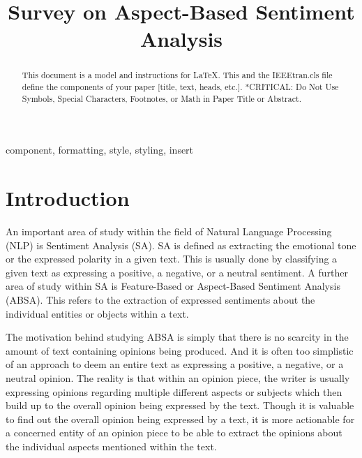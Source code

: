 \documentclass[conference]{IEEEtran}
\begin{document}
\title{Survey on Aspect-Based Sentiment Analysis}

\author{
}

\maketitle

\begin{abstract}
This document is a model and instructions for \LaTeX.
This and the IEEEtran.cls file define the components of your paper [title, text, heads, etc.]. *CRITICAL: Do Not Use Symbols, Special Characters, Footnotes, 
or Math in Paper Title or Abstract.
\end{abstract}

\begin{IEEEkeywords}
component, formatting, style, styling, insert
\end{IEEEkeywords}

\section{Introduction}
An important area of study within the field of Natural Language Processing (NLP) is Sentiment Analysis (SA). SA is defined as extracting the emotional tone or the expressed polarity in a given text. This is usually done by classifying a given text as expressing a positive, a negative, or a neutral sentiment. A further area of study within SA is Feature-Based or Aspect-Based Sentiment Analysis (ABSA). This refers to the extraction of expressed sentiments about the individual entities or objects within a text.

The motivation behind studying ABSA is simply that there is no scarcity in the amount of text containing opinions being produced. And it is often too simplistic of an approach to deem an entire text as expressing a positive, a negative, or a neutral opinion. The reality is that within an opinion piece, the writer is usually expressing opinions regarding multiple different aspects or subjects which then build up to the overall opinion being expressed by the text. Though it is valuable to find out the overall opinion being expressed by a text, it is more actionable for a concerned entity of an opinion piece to be able to extract the opinions about the individual aspects mentioned within the text.
\end{document}
